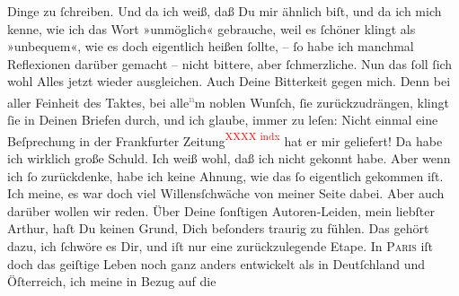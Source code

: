 \begin{ledgroupsized}[t]{13cm}
               Dinge zu ſchreiben. Und da ich weiß, daß Du mir ähnlich biſt, und da ich mich kenne,
               wie ich das Wort »unmöglich« gebrauche, weil es ſchöner klingt als »unbequem«, {\pb}wie es doch eigentlich heißen ſollte, – ſo habe ich
               manchmal Reflexionen darüber gemacht – nicht bittere, aber ſchmerzliche. Nun das ſoll
               ſich wohl Alles jetzt wieder ausgleichen. Auch Deine Bitterkeit gegen mich. Denn bei
               aller Feinheit des Taktes, bei alle\substVorne{}\textsuperscript{\textcolor{gray}{n}}\substDazwischen{}m\substHinten{} noblen Wunſch, ſie zurückzudrängen, klingt ſie in Deinen Briefen durch, und
               ich glaube, immer zu leſen: Nicht einmal eine Beſprechung in der Frankfurter Zeitung\textcolor{red}{\textsuperscript{XXXX indx}} hat er mir geliefert! Da habe ich
               wirklich große Schuld. Ich weiß wohl, daß ich nicht gekonnt habe. Aber wenn ich ſo
               zurückdenke, habe ich keine Ahnung, wie das ſo eigentlich {\pb}gekommen iſt. Ich meine, es war doch viel
               Willensſchwäche von meiner Seite dabei. Aber auch darüber wollen wir reden. Über
               Deine ſonſtigen Autoren-Leiden, mein liebſter Arthur,  haſt Du keinen Grund, Dich beſonders traurig zu fühlen. Das gehört dazu, ich
               ſchwöre es Dir, und iſt nur eine zurückzulegende Etape. In \textsc{Paris} iſt doch das geiſtige Leben noch ganz anders entwickelt als in Deutſchland und Öſterreich, ich meine in Bezug auf die \label{K_L02712-3v}
\end{ledgroupsized}
